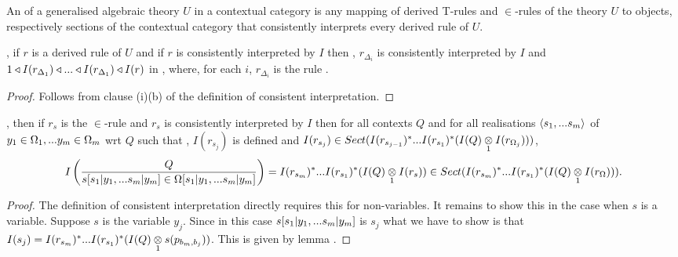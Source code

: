 \begin{definition}
An  of a generalised algebraic theory $U$ in a contextual category \catcw is  any mapping 
of derived T-rules and $\in$-rules of the theory $U$ to objects, respectively sections of the contextual category \catcw that
consistently interprets every derived rule of $U$.
\end{definition}

\begin{lemma}
\IfIpartialmappingUtoC, if $r$ is a derived rule \ZDelta of $U$ and if
$r$ is consistently interpreted by $I$ 
then \foreachi, $r_{\Delta_i}$ is consistently interpreted by $I$ and 
$1 \base I(r_{\Delta_1}) \base ... \base I(r_{\Delta_1}) \base I(r)$ in \catc,
where, for each $i$, $r_{\Delta_i}$ is the rule .
\end{lemma}
\begin{proof}
Follows from clause (i)(b) of the definition of consistent interpretation.
\end{proof}

\begin{lemma}
\IfIpartialmappingUtoC,
then if $r_s$ is the $\in$-rule \ZsOmega and 
$r_s$ is consistently interpreted by $I$ then
for all contexts $Q$ and for all realisations $\tuple{\sm}$ of $\yOmega{m}$ wrt $Q$  
such that \foreachj, $I(r_{s_j})$ is defined 
and $I(r_{s_j}) \in Sect(I(r_{s_{j-1}})^*...I(r_{s_1})^*(\crossx{I(Q)}{I(r_{\Omega_j})}{1}))$,
$$ \Imappedrule{Q}{\ofT{s[\SUBsFORy{m}]}{\Omega[\SUBsFORy{m}]}} 
= I(r_{s_m})^*...I(r_{s_1})^*(\crossx{I(Q)}{I(r_s)}{1})
\in Sect (I(r_{s_m})^*...I(r_{s_1})^*(\crossx{I(Q)}{I(r_\Omega)}{1})).$$
\end{lemma}
\begin{proof}
The definition of consistent interpretation directly requires this for non-variables. 
It remains to show  this in the case when $s$ is a variable. Suppose $s$ is the variable
$y_j$. Since in this case $s[\SUBsFORy{m}]$ is $s_j$ what we have to show is that
$I(s_j) = I(r_{s_m})^*...I(r_{s_1})^*(\crossx{I(Q)}{s(p_{b_m,b_j}}{1}))$. This is given by lemma .
\end{proof}


